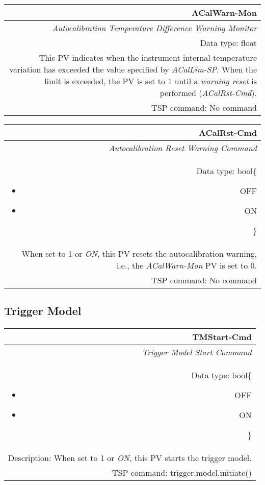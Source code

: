 \documentclass[openany]{article}
\begin{document}
		\begin{tabular}{N}
			\hline
			\bfseries ACalWarn-Mon\label{pv:acalwarn-mon} \\ \hline
			\emph{Autocalibration Temperature Difference Warning Monitor} \\
			Data type: float \\
			This PV indicates when the instrument internal temperature variation has exceeded the value specified by \emph{ACalLim-SP}. When the limit is exceeded, the PV is set to 1 until a \emph{warning reset} is performed (\emph{ACalRst-Cmd}). \\
			TSP command: No command
		\end{tabular}

		\begin{tabular}{N}
			\hline
			\bfseries ACalRst-Cmd\label{pv:acalrst-cmd} \\ \hline
			\emph{Autocalibration Reset Warning Command} \\
			Data type: bool\{\begin{itemize}[noitemsep]
				\small
				\item[] OFF
				\item[] ON
			\end{itemize}\} \\
			When set to 1 or \emph{ON}, this PV resets the autocalibration warning, i.e., the \emph{ACalWarn-Mon} PV is set to 0. \\
			TSP command: No command
		\end{tabular}

	\subsection{Trigger Model}\label{pvgroup:trigger-model}

		\paragraph{} %

		\begin{tabular}{N}
			\hline
			\bfseries TMStart-Cmd\label{pv:tmstart-cmd} \\ \hline
			\emph{Trigger Model Start Command} \\
			Data type: bool\{\begin{itemize}[noitemsep]
				\small
				\item[] OFF
				\item[] ON
			\end{itemize}\} \\
			Description: When set to 1 or \emph{ON}, this PV starts the trigger model. \\
			TSP command: trigger.model.initiate()
		\end{tabular}
\end{document}
